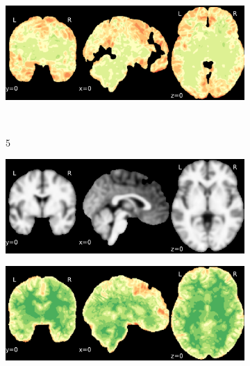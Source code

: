 \documentclass{article}
\begin{document}
\begin{landscape}
\begin{figure}
\begin{subfigure}[t]{0.2\paperheight}
        \end{subfigure}
        \begin{subfigure}[t]{0.2\paperheight}
            \centering
            \includegraphics[width=\textwidth]{figures/sig/fwhm_5/rr.rs_ds000256_sub-CTS210_sig.pdf}
        \end{subfigure} \\
        \begin{subfigure}[b][][c]{0.01\paperwidth} 5 \vspace*{15pt} \end{subfigure}
        \begin{subfigure}[t]{0.2\paperheight}
            \centering
            \includegraphics[width=\textwidth]{figures/ieee_T1/fwhm_5/ieee_ds001748_sub-adult15.pdf}
        \end{subfigure}
        \begin{subfigure}[t]{0.2\paperheight}
            \centering
            \includegraphics[width=\textwidth]{figures/sig/fwhm_5/rr_ds001748_sub-adult15_sig.pdf}

\end{subfigure}
\end{figure}
\end{landscape}
\end{document}
